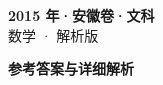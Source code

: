 \documentclass[zihao=-4, a4paper]{ctexart}
\begin{document}
\begin{center}
  {\Large\bfseries 2015 年·安徽卷·文科}\\[4pt]
  {\large 数学 · 解析版}
\end{center}
\medskip
{}

\clearpage
{}
\begin{center}{\Large\bfseries 参考答案与详细解析}\end{center}
\medskip

\end{document}
